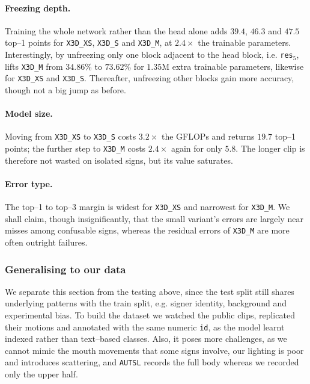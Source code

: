 \paragraph{Freezing depth.} Training the whole network rather than the head alone adds $39.4$, $46.3$ and $47.5$ top--1 points for \texttt{X3D\_XS}, \texttt{X3D\_S} and \texttt{X3D\_M}, at $2.4\times$ the trainable parameters.
Interestingly, by unfreezing only one block adjacent to the head block, i.e. \texttt{res}$_5$, lifts \texttt{X3D\_M} from $34.86\%$ to $73.62\%$ for $1.35$M extra trainable parameters, likewise for \texttt{X3D\_XS} and \texttt{X3D\_S}.
Thereafter, unfreezing other blocks gain more accuracy, though not a big jump as before.

\paragraph{Model size.} Moving from \texttt{X3D\_XS} to \texttt{X3D\_S} costs $3.2\times$ the GFLOPs and returns $19.7$ top--1 points; the further step to \texttt{X3D\_M} costs $2.4\times$ again for only $5.8$.
The longer clip is therefore not wasted on isolated signs, but its value saturates.

\paragraph{Error type.} The top--1 to top--3 margin is widest for \texttt{X3D\_XS} and narrowest for \texttt{X3D\_M}.
We shall claim, though insignificantly, that the small variant's errors are largely near misses among confusable signs, whereas the residual errors of \texttt{X3D\_M} are more often outright failures.

\subsubsection{Generalising to our data}

We separate this section from the testing above, since the test split still shares underlying patterns with the train split, e.g. signer identity, background and experimental bias.
To build the dataset we watched the public clips, replicated their motions and annotated with the same numeric \texttt{id}, as the model learnt indexed rather than text--based classes.
Also, it poses more challenges, as we cannot mimic the mouth movements that some signs involve, our lighting is poor and introduces scattering, and \texttt{AUTSL} records the full body whereas we recorded only the upper half.

